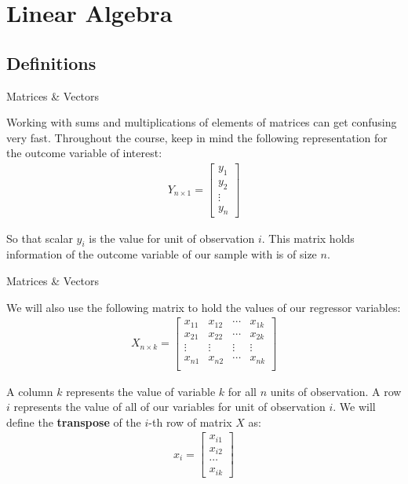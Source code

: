 \section{Linear Algebra}

\subsection{Definitions}

\begin{frame}{Matrices \& Vectors}

    Working with sums and multiplications of elements of matrices can get confusing very fast. Throughout the course, keep in mind the following representation for the outcome variable of interest:
    \begin{align*}
        Y_{n \times 1} = \begin{bmatrix} 
            y_1 \\
            y_2 \\
            \vdots \\
            y_n
            \end{bmatrix}
    \end{align*}

    So that scalar $y_i$ is the value for unit of observation $i$. This matrix holds information of the outcome variable of our sample with is of size $n$.
    
\end{frame}

\begin{frame}{Matrices \& Vectors}

    We will also use the following matrix to hold the values of our regressor variables:
    \begin{align*}
        X_{n \times k} = \begin{bmatrix} 
            x_{11} & x_{12} & \cdots & x_{1k} \\
            x_{21} & x_{22} & \cdots & x_{2k} \\
            \vdots & \vdots & \vdots & \vdots \\
            x_{n1} & x_{n2} & \cdots & x_{nk} \\
            \end{bmatrix}
    \end{align*}

    A column $k$ represents the value of variable $k$ for all $n$ units of observation. A row $i$ represents the value of all of our variables for unit of observation $i$. We will define the \textbf{transpose} of the $i$-th row of matrix $X$ as:
    \begin{align*}
        x_i = \begin{bmatrix} x_{i1} \\
                        x_{i2} \\ \cdots \\ x_{ik} \end{bmatrix}
    \end{align*}
    
\end{frame}

